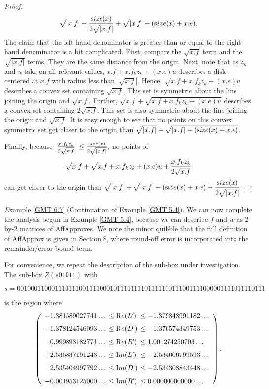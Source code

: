 {\begin{proof}{}
$$\sqrt{|x.f|} - {{\textrm size}(x) \over 2 \sqrt {|x.f|}} + \sqrt {|x.f| - ({\textrm size}(x) + x.e)}.$$
The claim that the left-hand denominator is greater than or equal to the right-hand denominator is a bit complicated.  First, compare the $\sqrt{x.f}$ term and the $\sqrt{|x.f|}$ terms.  They are the same distance from the origin.  Next, note that as $z_k$ and $u$ take on all
relevant values, $x.f + x.f_k z_k + (x.e) u$ describes a disk centered at $x.f$
with radius   less than $ |\sqrt {x.f}|$.  Hence, $\sqrt {x.f + x.f_k z_k + (x.e) u}$ describes a convex set containing $\sqrt{x.f}$.  This set
is symmetric about the line joining the origin and $\sqrt{x.f}$. Further, $\sqrt{x.f} + \sqrt {x.f + x.f_k z_k + (x.e) u}$ describes a convex
set containing $2 \sqrt{x.f}$.   This set is also symmetric about the line joining the origin and  $\sqrt{x.f}$.
It is easy enough to see that no points on this convex symmetric set get closer to the origin than $\sqrt{|x.f|}  + \sqrt {|x.f| - ({\textrm size}(x) + x.e)}$.

Finally, because $|{x.f_k z_k \over 2 \sqrt{x.f}}| \le {{\textrm size}(x) \over 2 \sqrt {|x.f|}},$ no points of $$\sqrt {x.f} + \sqrt {x.f + x.f_k z_k + (x.e) u} + 
{x.f_k z_k \over 2 \sqrt{x.f}}$$
can get closer to the origin than
\hfill ${\displaystyle \sqrt{|x.f|} + \sqrt {|x.f| - ({\textrm size}(x) + x.e)} - 
{{\textrm size}(x) \over 2 \sqrt {|x.f|}}.} $ \end{proof}

{\textit Example} \ref{GMT 6.7} (Continuation of Example \ref{GMT 5.4}).
We can now complete the analysis begun in Example \ref{GMT 5.4},
because we can describe $f$ and $w$ as 2-by-2 matrices of AffApproxes.
We note the minor quibble that the full definition of AffApprox is
given in Section 8, where round-off error is incorporated into
the remainder/error-bound term.

For convenience,
we repeat the description of the sub-box under investigation.
The sub-box $Z(s01011)$ with  
\begin{small}
$$s = 001000110001110111001111000101111111101111100111001111000001111011110111$$ 
\end{small}%

\noindent is the region where
$$\left(\begin{array}{rll}
-1.381589027741\ldots &\hskip-6pt \le  {\mathrm Re}(L')&  \hskip-6pt\le  -1.379848991182\ldots\\[7pt]
-1.378124546093\ldots &\hskip-6pt \le  {\mathrm Re}(D')&\hskip-6pt  \le  -1.376574349753\ldots\\[7pt]
0.999893182771\ldots  &\hskip-6pt\le {\mathrm Re}(R')& \hskip-6pt  \le  1.001274250703\ldots\\[7pt]
-2.535837191243\ldots &\hskip-6pt \le  {\mathrm Im}(L')&\hskip-6pt  \le  -2.534606799593\ldots\\[7pt]
2.535404997792\ldots & \hskip-6pt\le  {\mathrm Im}(D') &\hskip-6pt \le  -2.534308843448\ldots\\[7pt]
-0.001953125000\ldots &\hskip-6pt \le {\mathrm  Im}(R')&\hskip-6pt  \le  0.000000000000\ldots
\end{array}\right).$$ 

}
